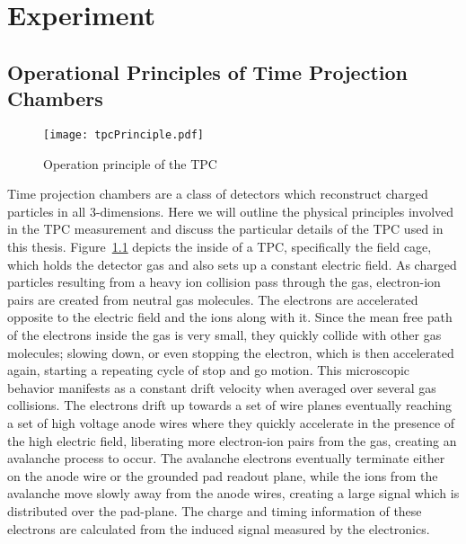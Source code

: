 \chapter{Experiment}

\section{Operational Principles of Time Projection Chambers}


\begin{figure}[!htb]
\texttt{[image: tpcPrinciple.pdf]}
\caption{Operation principle of the TPC}
\label{fig:tpcPrinciple}

\end{figure}
Time projection chambers are a class of detectors which reconstruct charged particles in all 3-dimensions. Here we will outline the physical principles involved in the TPC measurement and discuss the particular details of the TPC used in this thesis. Figure~\ref{fig:tpcPrinciple} depicts the inside of a TPC, specifically the field cage, which holds the detector gas and also sets up a constant electric field. As charged particles resulting from a heavy ion collision pass through the gas, electron-ion pairs are created from neutral gas molecules. The electrons are accelerated opposite to the electric field and the ions along with it. Since the mean free path of the electrons inside the gas is very small, they quickly collide with other gas molecules; slowing down, or even stopping the electron, which is then accelerated again, starting a repeating cycle of stop and go motion. This microscopic behavior manifests as a constant drift velocity when averaged over several gas collisions. The electrons drift up towards a set of wire planes eventually reaching a set of high voltage anode wires where they quickly accelerate in the presence of the high electric field, liberating more electron-ion pairs from the gas, creating an avalanche process to occur. The avalanche electrons eventually terminate either on the anode wire or the grounded pad readout plane,  while the ions from the avalanche move slowly away from the anode wires, creating a large signal which is distributed over the pad-plane. The charge and timing  information of these electrons are calculated from the induced signal measured by the  electronics. 

